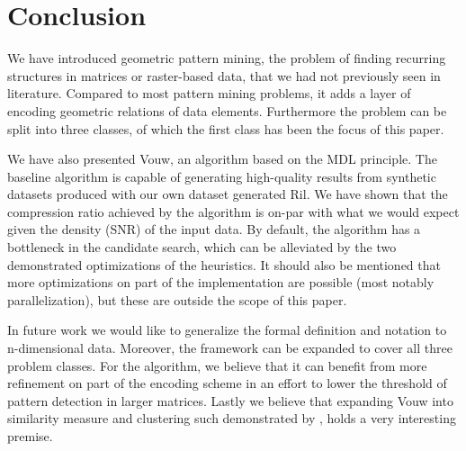 \documentclass{llncs}
\begin{document}
\section{Conclusion}

We have introduced geometric pattern mining, the problem of finding recurring structures in matrices or raster-based data, that we had not previously seen in literature. Compared to most pattern mining problems, it adds a layer of encoding geometric relations of data elements. Furthermore the problem can be split into three classes, of which the first class has been the focus of this paper.

We have also presented Vouw, an algorithm based on the MDL principle. The baseline algorithm is capable of generating high-quality results from synthetic datasets produced with our own dataset generated Ril. We have shown that the compression ratio achieved by the algorithm is on-par with what we would expect given the density (SNR) of the input data. By default, the algorithm has a bottleneck in the candidate search, which can be alleviated by the two demonstrated optimizations of the heuristics. It should also be mentioned that more optimizations on part of the implementation are possible (most notably parallelization), but these are outside the scope of this paper.

In future work we would like to generalize the formal definition and notation to n-dimensional data. Moreover, the framework can be expanded to cover all three problem classes. For the algorithm, we believe that it can benefit from more refinement on part of the encoding scheme in an effort to lower the threshold of pattern detection in larger matrices. Lastly we believe that expanding Vouw into similarity measure and clustering such demonstrated by \cite{campana2010compression}, holds a very interesting premise.
\end{document}
